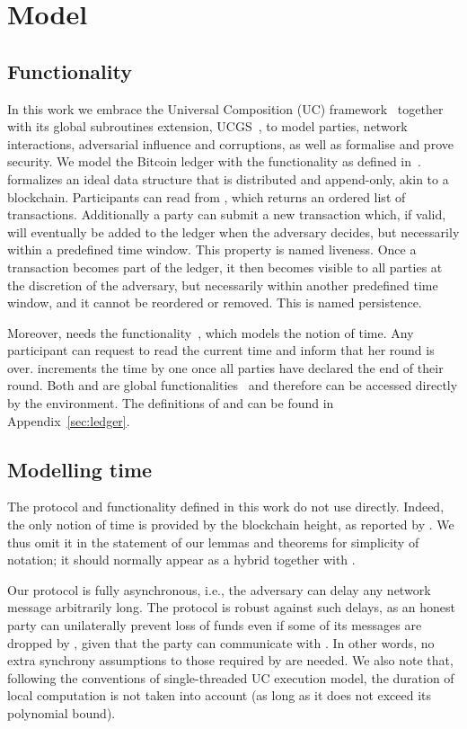 \section{Model}

  \subsection{\ledger Functionality}
  In this work we embrace the Universal Composition (UC) framework~\cite{uc}
  together with its global subroutines extension,
  UCGS~\cite{DBLP:conf/tcc/BadertscherCHTZ20}, to
  model parties, network interactions, adversarial influence and corruptions, as
  well as formalise and prove security. We model the Bitcoin ledger
  with the \ledger
  functionality as defined in~\cite{BMTZ17,genesis}. \ledger formalizes an ideal
  data structure that is
  distributed and append-only, akin to a blockchain. Participants can read from
  \ledger, which returns an ordered list of transactions. Additionally a party
  can submit a new transaction which, if valid, will eventually be added to the
  ledger when the adversary decides, but necessarily within a predefined time
  window. This property is named liveness. Once a transaction becomes part of
  the ledger, it then becomes visible to all parties at the discretion of the
  adversary, but necessarily within another predefined time window, and it
  cannot be reordered or removed. This is named persistence.

  Moreover, \ledger needs the \Fclock
  functionality~\cite{DBLP:conf/tcc/KatzMTZ13}, which models the notion of time.
  Any \Fclock participant can request to read the current time and inform \Fclock that her round is over. \Fclock increments the
  time by one once all parties have declared the end of their round. Both
  \ledger and \Fclock are global
  functionalities~\cite{DBLP:conf/tcc/BadertscherCHTZ20} and therefore can be
  accessed directly by the environment. The definitions of \ledger and \Fclock
  can be found in Appendix~\ref{sec:ledger}.

  \subsection{Modelling time}
  The protocol and functionality defined in this work do not use \Fclock
  directly. Indeed, the only notion of time is provided by the
  blockchain height, as reported by \ledger. We thus omit it in the
  statement of our lemmas and theorems for simplicity of notation; it should
  normally appear as a hybrid together with \ledger.

  Our protocol is fully asynchronous, i.e., the adversary can delay any network
  message arbitrarily long. The protocol is robust against such delays, as an
  honest party can unilaterally prevent loss of funds even if some of its
  messages are dropped by \adversary, given that
  the party can communicate with \ledger. In other words, no
  extra synchrony assumptions to those required by \ledger are needed. We
  also note that,
  following the conventions of single-threaded UC execution model, the duration of local
  computation is not taken into account (as long as it does not
  exceed its polynomial bound).
